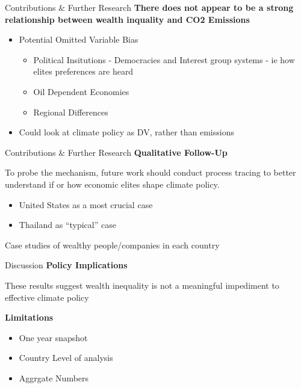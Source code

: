 \documentclass[
  ignorenonframetext,
]{beamer}
\providecommand{\tightlist}{%
  \setlength{\itemsep}{0pt}\setlength{\parskip}{0pt}}
\begin{document}
\begin{frame}{Contributions \& Further Research}
\protect{}\label{contributions-further-research}
\textbf{There does not appear to be a strong relationship between wealth
inquality and CO2 Emissions}

\begin{itemize}
\tightlist
\item
  Potential Omitted Variable Bias

  \begin{itemize}
  \tightlist
  \item
    Political Insitutions - Democracies and Interest group systems - ie
    how elites preferences are heard
  \item
    Oil Dependent Economies
  \item
    Regional Differences
  \end{itemize}
\item
  Could look at climate policy as DV, rather than emissions
\end{itemize}
\end{frame}

\begin{frame}{Contributions \& Further Research}
\protect{}\label{contributions-further-research-1}
\textbf{Qualitative Follow-Up}

To probe the mechanism, future work should conduct process tracing to
better understand if or how economic elites shape climate policy.

\begin{itemize}
\tightlist
\item
  United States as a most crucial case
\item
  Thailand as ``typical'' case
\end{itemize}

Case studies of wealthy people/companies in each country
\end{frame}

\begin{frame}{Discussion}
\protect{}\label{discussion}
\textbf{Policy Implications}

These results suggest wealth inequality is not a meaningful impediment
to effective climate policy

\textbf{Limitations}

\begin{itemize}
\tightlist
\item
  One year snapshot
\item
  Country Level of analysis
\item
  Aggrgate Numbers
\end{itemize}
\end{frame}
\end{document}
